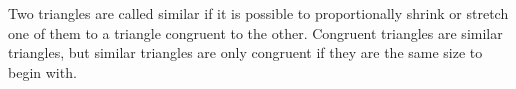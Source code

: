 \begin{table}[H]
          
          \label{m38380*eip-665}Two triangles are called similar if it is
possible to proportionally shrink or stretch one of them to a triangle congruent
to the other. Congruent triangles are similar triangles, but similar triangles
are only congruent if they are the same size to begin with.\par 
    
      
    
    \setlength\mytablespace{4\tabcolsep}
    \addtolength\mytablespace{3\arrayrulewidth}
    \setlength\mytablewidth{\linewidth}
        
    
    \setlength\mytableroom{\mytablewidth}
    \addtolength\mytableroom{-\mytablespace}
    
    \setlength\myfixedwidth{0pt}
    \setlength\mystarwidth{\mytableroom}
        \addtolength\mystarwidth{-\myfixedwidth}
        \divide{}
        
    
            
    
        \begin{center}
      
      \label{m38380*id318196}
      
    \noindent
      \tablelasttail{}
     
\begin{xtabular*}{\mytablewidth}[t]{|p{10\mystarwidth}|p{10\mystarwidth}|}\hline
    
    
        

\end{xtabular*}
\end{center}
\end{table}
